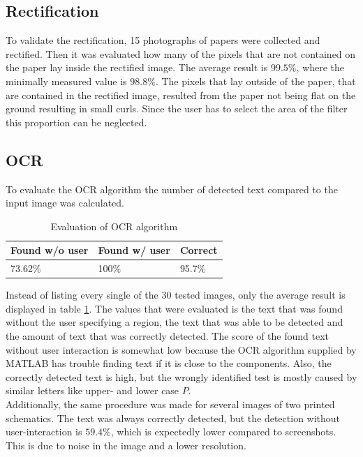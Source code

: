 \documentclass[10pt,twocolumn,letterpaper]{article}
\begin{document}
\subsection{Rectification}

To validate the rectification, 15 photographs of papers were collected and rectified. Then it was evaluated how many of the pixels that are not contained on the paper lay inside the rectified image. The average result is $99.5\%$, where the minimally measured value is $98.8\%$. The pixels that lay outside of the paper, that are contained in the rectified image, resulted from the paper not being flat on the ground resulting in small curls. Since the user has to select the area of the filter this proportion can be neglected.

\subsection{OCR}

To evaluate the OCR algorithm the number of detected text compared to the input image was calculated. 

\begin{table}[!ht]
\centering
\caption{Evaluation of OCR algorithm}
\label{tab:ocr}
\begin{tabular}{|l|l|l|}
\hline
Found w/o user & Found w/ user & Correct \\ \hline
73.62\%        & 100\%         & 95.7\%  \\ \hline
\end{tabular}
\end{table}

Instead of listing every single of the 30 tested images, only the average result is displayed in table \ref{tab:ocr}. The values that were evaluated is the text that was found without the user specifying a region, the text that was able to be detected and the amount of text that was correctly detected. The score of the found text without user interaction is somewhat low because the OCR algorithm supplied by MATLAB has trouble finding text if it is close to the components. Also, the correctly detected text is high, but the wrongly identified test is mostly caused by similar letters like upper- and lower case $P$.\\
Additionally, the same procedure was made for several images of two printed schematics. The text was always correctly detected, but the detection without user-interaction is $59.4\%$, which is expectedly lower compared to screenshots. This is due to noise in the image and a lower resolution.
\end{document}
